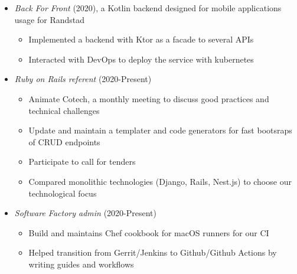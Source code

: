 \documentclass[10pt,a4paper,sans]{moderncv} %
\begin{document}
{\begin{itemize}
\begin{itemize}
	\item Implemented website and REST API with Ruby on Rails
	\item Deployed infrastructure on Azure in France and Hong-Kong with terraform
	\end{itemize}
\item \textit{Back For Front} (2020), a Kotlin backend designed for mobile applications usage for Randstad
	\begin{itemize}
	\item Implemented a backend with Ktor as a facade to several APIs
	\item Interacted with DevOps to deploy the service with kubernetes
	\end{itemize}
\item \textit{Ruby on Rails referent} (2020-Present)
	\begin{itemize}
	\item Animate Cotech, a monthly meeting to discuss good practices and technical challenges
	\item Update and maintain a templater and code generators for fast bootsraps of CRUD endpoints
	\item Participate to call for tenders
	\item Compared monolithic technologies (Django, Rails, Nest.js) to choose our technological focus
	\end{itemize}
\item \textit{Software Factory admin} (2020-Present)
	\begin{itemize}
	\item Build and maintains Chef cookbook for macOS runners for our CI
	\item Helped transition from Gerrit/Jenkins to Github/Github Actions by writing guides and workflows
	\end{itemize}
\end{itemize}}

\end{document}
